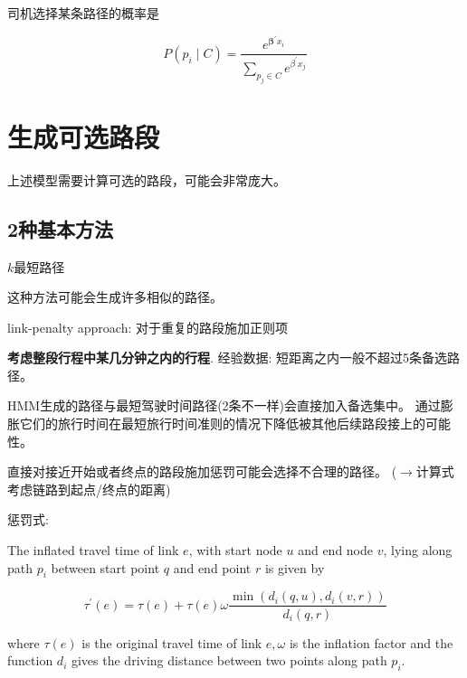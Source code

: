 司机选择某条路径的概率是

\begin{equation} P\left(p_{i} \mid C\right)=\frac{e^{\boldsymbol{\beta}^{\prime} x_{i}}}{\sum_{p_{j} \in C} e^{\beta^{\prime} x_{j}}} \end{equation}

\section{生成可选路段}

上述模型需要计算可选的路段，可能会非常庞大。

\subsection{2种基本方法}

$k$最短路径

\begin{remark}
    这种方法可能会生成许多相似的路径。
\end{remark}

link-penalty approach: 对于重复的路段施加正则项

\textbf{考虑整段行程中某几分钟之内的行程}. 经验数据: 短距离之内一般不超过5条备选路径。 

HMM生成的路径与最短驾驶时间路径(2条不一样)会直接加入备选集中。 通过膨胀它们的旅行时间在最短旅行时间准则的情况下降低被其他后续路段接上的可能性。

\begin{remark}
    直接对接近开始或者终点的路段施加惩罚可能会选择不合理的路径。 ($\rightarrow$计算式考虑链路到起点/终点的距离)
\end{remark}

惩罚式:

\begin{definition}
    The inflated travel time of link $ e $, with start node $ u $ and end node $ v $, lying along path $ p_{i} $ between start point $ q $ and end point $ r $ is given by

\begin{equation} \tau^{\prime}(e)=\tau(e)+\tau(e) \omega \frac{\min \left(d_{i}(q, u), d_{i}(v, r)\right)}{d_{i}(q, r)} \end{equation}

where $ \tau(e) $ is the original travel time of link $ e, \omega $ is the inflation factor and the function $ d_{i} $ gives the driving distance
between two points along path $p_i$.
\end{definition}

